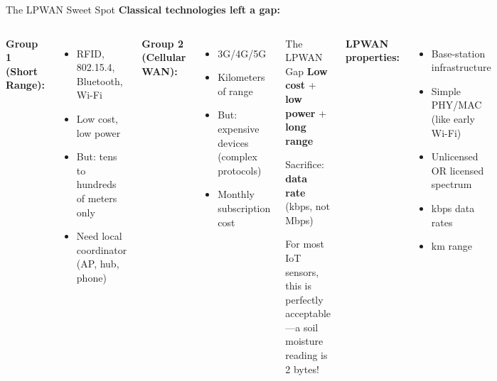 \documentclass[aspectratio=169,11pt]{beamer}
\begin{document}
\begin{frame}{The LPWAN Sweet Spot}
    \textbf{Classical technologies left a gap:}
    
    \vspace{0.2cm}
    \begin{columns}
        \textbf{Group 1 (Short Range):}
        \begin{itemize}
            \item RFID, 802.15.4, Bluetooth, Wi-Fi
            \item Low cost, low power
            \item But: tens to hundreds of meters only
            \item Need local coordinator (AP, hub, phone)
        \end{itemize}
        
        \vspace{0.2cm}
        \textbf{Group 2 (Cellular WAN):}
        \begin{itemize}
            \item 3G/4G/5G
            \item Kilometers of range
            \item But: expensive devices (complex protocols)
            \item Monthly subscription cost
        \end{itemize}
        
        \begin{alertblock}{The LPWAN Gap}
            \textbf{Low cost} + \textbf{low power} + \textbf{long range}
            
            \vspace{0.2cm}
            Sacrifice: \textbf{data rate} (kbps, not Mbps)
            
            \vspace{0.2cm}
            For most IoT sensors, this is perfectly acceptable---a soil moisture reading is 2 bytes!
        \end{alertblock}
        
        \vspace{0.2cm}
        \textbf{LPWAN properties:}
        \begin{itemize}
            \item Base-station infrastructure
            \item Simple PHY/MAC (like early Wi-Fi)
            \item Unlicensed OR licensed spectrum
            \item kbps data rates
            \item km range
        \end{itemize}
    \end{columns}
\end{frame}
\end{document}
